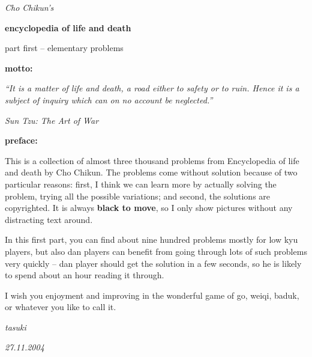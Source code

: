 \documentclass[11pt]{book}
\begin{document}
\begin{titlepage}

    \vspace*{0.2\textheight}

    \begin{center}
        \textit{\large Cho Chikun's}
    \end{center}
    \begin{center}
        \textbf{\huge encyclopedia of life and death}
    \end{center}
    \begin{center}
        {\large part first -- elementary problems}
    \end{center}

\end{titlepage}

\newpage %


\noindent\textbf{\Large motto:}

\medskip
\textit{\normalsize ``It is a matter of life and death, a road either to safety or to ruin. Hence it is a subject of inquiry which can on no account be neglected.''}

\medskip
\hfill {\it Sun Tzu: The Art of War}
\bigskip

\noindent\textbf{\Large preface:}

\medskip
{
\normalsize
This is a collection of almost three thousand problems from Encyclopedia of life and death by Cho Chikun. The problems come without solution because of two particular reasons: first, I think we can learn more by actually solving the problem, trying all the possible variations; and second, the solutions are copyrighted. It is always {\bf black to move}, so I only show pictures without any distracting text around.

In this first part, you can find about nine hundred problems mostly for low kyu players, but also dan players can benefit from going through lots of such problems very quickly -- dan player should get the solution in a few seconds, so he is likely to spend about an hour reading it through.

I wish you enjoyment and improving in the wonderful game of go, weiqi, baduk, or whatever you like to call it.
}

\medskip
\hfill \textit{tasuki}

\hfill \textit{27.11.2004}

\newpage %


\begin{multicols}{2}
    
\end{multicols}
\end{document}
